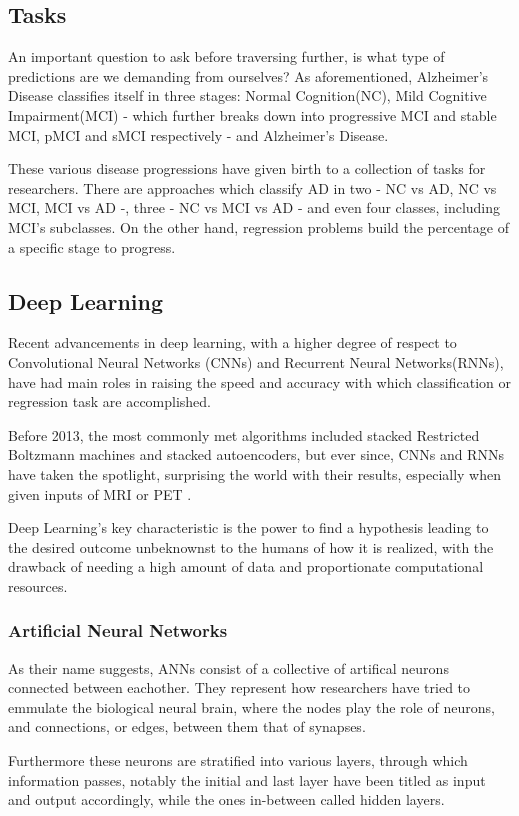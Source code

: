 \documentclass[a4paper, 12pt]{article}
\begin{document}
\subsection*{Tasks}
An important question to ask before traversing further, is what type of predictions are we demanding from ourselves?
As aforementioned, Alzheimer's Disease classifies itself in three stages: Normal Cognition(NC), Mild Cognitive Impairment(MCI)
- which further breaks down into progressive MCI and stable MCI, pMCI and sMCI respectively - and Alzheimer's Disease.

These various disease progressions have given birth to a collection of tasks for researchers. There are approaches
which classify AD in two - NC vs AD, NC vs MCI, MCI vs AD -, three - NC vs MCI vs AD - and even four classes, including MCI's
subclasses. On the other hand, regression problems build the percentage of a specific stage to progress.

\subsection*{Deep Learning}
Recent advancements in deep learning, with a higher degree of respect to Convolutional Neural Networks (CNNs) and Recurrent
Neural Networks(RNNs), have had main roles in raising the speed and accuracy with which classification or regression task
are accomplished.

Before 2013, the most commonly met algorithms included stacked Restricted Boltzmann machines and stacked autoencoders,
but ever since, CNNs and RNNs have taken the spotlight, surprising the world with their results, especially when given
inputs of MRI or PET \cite{make6010024}.

Deep Learning's key characteristic is the power to find a hypothesis leading to the desired outcome unbeknownst to the
humans of how it is realized, with the drawback of needing a high amount of data and proportionate computational resources.

\subsubsection*{Artificial Neural Networks}
As their name suggests, ANNs consist of a collective of artifical neurons connected between eachother. They represent how
researchers have tried to emmulate the biological neural brain, where the nodes play the role of neurons, and connections,
or edges, between them that of synapses.

Furthermore these neurons are stratified into various layers, through which information passes, notably the initial and last
layer have been titled as input and output accordingly, while the ones in-between called hidden layers.
\end{document}
